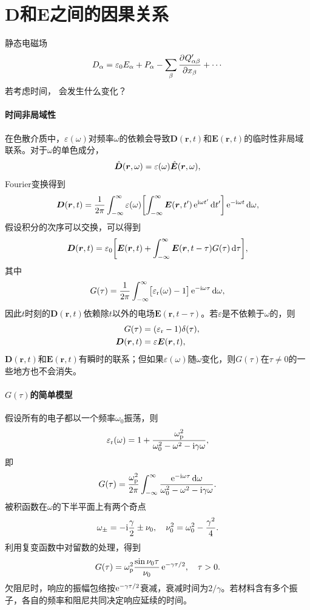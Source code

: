 \section{\texorpdfstring{$\bm D$}{D}和\texorpdfstring{$\bm E$}{E}之间的因果关系}

静态电磁场
\[
    D_\alpha = \varepsilon_0E_\alpha + P_\alpha - \sum_\beta\frac{\partial^{}Q'_{\alpha\beta}}{\partial{x_\beta}^{}} + \cdots
\]
若考虑时间，
会发生什么变化？

\paragraph{时间非局域性}

在色散介质中，$\varepsilon(\omega)$对频率$\omega$的依赖会导致$\bm D(\bm r,t)$和$\bm E(\bm r,t)$的临时性非局域联系。对于$\omega$的单色成分，
\[
    \hat{\bm{D}}(\bm r,\omega) = \varepsilon(\omega)\hat{\bm{E}}(\bm r,\omega),
\]
Fourier变换得到
\[
    \bm D(\bm r,t) = \frac1{2\pi}\int_{-\infty}^\infty\varepsilon(\omega)\biggl[\int_{-\infty}^\infty\bm E(\bm r,t')\mathop{}\!\mathrm{e}^{\mathrm{i}\omega t'}\mathop{}\!\mathrm{d} t'\biggr]\mathop{}\!\mathrm{e}^{-\mathrm{i}\omega t}\mathop{}\!\mathrm{d}\omega,
\]
假设积分的次序可以交换，可以得到
\begin{equation}
    \label{eqn:D-E with omega}
    \bm D(\bm r,t) = \varepsilon_0\biggl[\bm E(\bm r,t) + \int_{-\infty}^\infty\bm E(\bm r,t - \tau)G(\tau)\mathop{}\!\mathrm{d}\tau\biggr],
\end{equation}
其中 
\begin{equation}
    \label{eq:ed-dielectric-memory-kernel}
    G(\tau) = \frac1{2\pi}\int_{-\infty}^\infty\bigl[\varepsilon_\mathrm r(\omega) - 1\bigr]\mathop{}\!\mathrm{e}^{-\mathrm{i}\omega\tau}\mathop{}\!\mathrm{d}\omega,
\end{equation}
因此$t$时刻的$\bm D(\bm r,t)$依赖除$t$以外的电场$\bm E(\bm r,t - \tau)$。若$\varepsilon$是不依赖于$\omega$的，则
\begin{align*}
    G(\tau) &= (\varepsilon_\mathrm r - 1)\delta(\tau),\\
    \bm D(\bm r,t) &= \varepsilon\bm E(\bm r,t),
\end{align*}
$\bm D(\bm r,t)$和$\bm E(\bm r,t)$有瞬时的联系；但如果$\varepsilon(\omega)$随$\omega$变化，则$G(\tau)$在$\tau \neq 0$的一些地方也不会消失。

\paragraph{$G(\tau)$的简单模型}

假设所有的电子都以一个频率$\omega_0$振荡，则 
\[
    \varepsilon_\mathrm r(\omega) = 1 + \frac{\omega_{\mathrm{p}}^2}{\omega_0^2 - \omega^2 - \mathrm{i}\gamma\omega},
\]
即 
\[
    G(\tau) = \frac{\omega_{\mathrm{p}}^2}{2\pi}\int_{-\infty}^\infty\frac{\mathop{}\!\mathrm{e}^{-\mathrm{i}\omega\tau}\mathop{}\!\mathrm{d}\omega}{\omega_0^2 - \omega^2 - \mathrm{i}\gamma\omega}.
\]
被积函数在$\omega$的下半平面上有两个奇点
\[
    \omega_\pm = -\mathrm{i}\frac\gamma 2 \pm \nu_0,\quad\nu_0^2 = \omega_0^2 - \frac{\gamma^2}4.
\]
利用复变函数中对留数的处理，得到
\begin{equation}
    \label{eq:ed-causal-lorentz-kernel}
    G(\tau) = \omega_{\mathrm{p}}^2\frac{\sin\nu_0\tau}{\nu_0}\mathop{}\!\mathrm{e}^{-\gamma\tau/2},\quad\tau > 0.
\end{equation}
欠阻尼时，响应的振幅包络按$\mathop{}\!\mathrm{e}^{-\gamma\tau/2}$衰减，衰减时间为$2/\gamma$。若材料含有多个振子，各自的频率和阻尼共同决定响应延续的时间。

